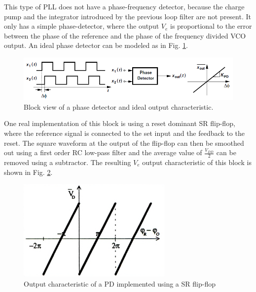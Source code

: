 \documentclass[lettersize,journal]{IEEEtran}
\begin{document}
This type of PLL does not have a phase-frequency detector, because the charge pump and the integrator introduced by the previous loop filter are not present. It only has a simple phase-detector, where the output $V_e$ is proportional to the error between the phase of the reference and the phase of the frequency divided VCO output. An ideal phase detector can be modeled as in Fig. \ref{fig:pd_schematic}.

\begin{figure}[!h]
    \centering
    \includegraphics[width=1\linewidth]{images/type_one_pll/pd_schematic.png}
    \caption{Block view of a phase detector and ideal output characteristic.}
    \label{fig:pd_schematic}
\end{figure}

One real implementation of this block is using a reset dominant SR flip-flop, where the reference signal is connected to the set input and the feedback to the reset. The square waveform at the output of the flip-flop can then be smoothed out using a first order RC low-pass filter and the average value of $\frac{V_{DD}}{2}$ can be removed using a subtractor. The resulting $V_e$ output characteristic of this block is shown in Fig. \ref{fig:output_srff}.

\begin{figure}[!h]
    \centering
    \includegraphics[width=1\linewidth]{images/type_one_pll/srff_output.png}
    \caption{Output characteristic of a PD implemented using a SR flip-flop}
    \label{fig:output_srff}
\end{figure}
\end{document}
